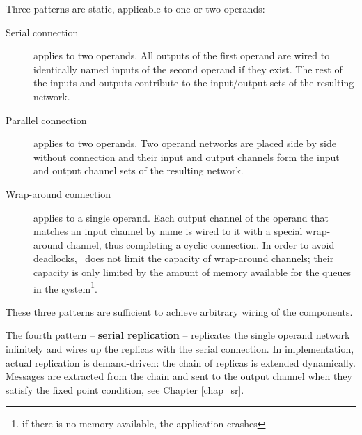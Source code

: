 Three patterns are static, applicable to one or two operands:
\begin{description}
\item[Serial connection] applies to two operands. All outputs of the first operand are wired to identically named inputs of the second operand if they exist. The rest of the inputs and outputs contribute to the input/output sets of the resulting network.

\item[Parallel connection] applies to two operands. Two operand networks are placed side by side without connection and their input and output channels form the input and output channel sets of the resulting network.

\item[Wrap-around connection] applies to a single operand. Each output channel of the operand that matches an input channel by name is wired to it with a special wrap-around channel, thus completing a cyclic connection. In order to avoid deadlocks, \ak\ does not limit the capacity of wrap-around channels; their capacity is only limited by the amount of memory available for the queues in the system\footnote{if there is no memory available, the application crashes}.
\end{description}
These three patterns are sufficient to achieve arbitrary wiring of the components. %

The fourth pattern -- \textbf{serial replication} -- replicates the single operand network infinitely and wires up the replicas with the serial connection. In implementation, actual replication is demand-driven: the chain of replicas is extended dynamically. Messages are extracted from the chain and sent to the output channel when they satisfy the fixed point condition, see Chapter \ref{chap_sr}.



